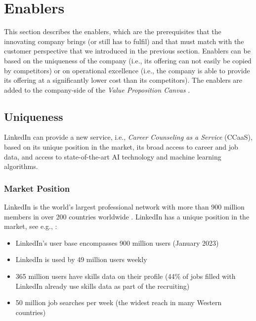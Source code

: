 \section{Enablers}
\label{sec:enablers}

This section describes the enablers, which are the prerequisites that the innovating company brings
(or still has to fulfil) and that must match with the customer perspective that we introduced
in the previous section. Enablers can be based on the uniqueness of the company (i.e., its offering can not
easily be copied by competitors) or on operational excellence (i.e., the company is able to provide its
offering at a significantly lower cost than its competitors). The enablers are added to the company-side
of the \emph{Value Proposition Canvas} \citep{osterwalderValuePropositionDesign2014}.

\subsection{Uniqueness}

LinkedIn can provide a new service, i.e., \textit{Career Counseling as a Service} (CCaaS), based on its
unique position in the market, its broad access to career and job data, and access to state-of-the-art 
AI technology and machine learning algorithms.

\subsubsection*{Market Position}

LinkedIn is the world's largest professional network with more than 900 million members in over 200 countries
worldwide \citep{linkedinLinkedInPressromUs2023}. LinkedIn has a unique position in the market, see e.g.,
\cite{kaserAIpoweredCareerCounseling2023,99firmsLinkedInStatistics20232023}: 

\begin{itemize}
    \item LinkedIn's user base encompasses 900 million users (January 2023)
    \item LinkedIn is used by 49 million users weekly
    \item 365 million users have skills data on their profile (44\% of jobs filled with
        LinkedIn already use skills data as part of the recruiting)
    \item 50 million job searches per week (the widest reach in many Western countries)
\end{itemize}

